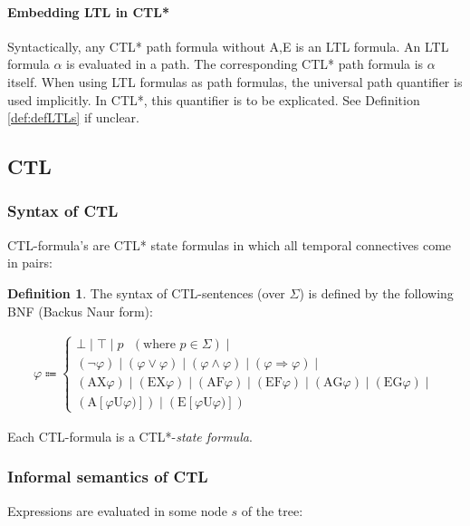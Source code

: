 \documentclass[10pt,a4paper]{article}
\theoremstyle{definition}
\newtheorem{definition}{Definition}[section]
\begin{document}
\paragraph{Embedding LTL in CTL*}

Syntactically, any CTL* path formula without A,E is an LTL formula. An LTL formula $\alpha$ is evaluated in a path. The corresponding CTL* path formula is $\alpha$ itself. When using LTL formulas as path formulas, the universal path quantifier is used implicitly. In CTL*, this quantifier is to be explicated. See Definition \ref{def:defLTLs} if unclear.

\subsection{CTL}

\subsubsection{Syntax of CTL}

CTL-formula’s are CTL* state formulas in which all temporal connectives come in pairs:

\begin{definition}
The syntax of CTL-sentences (over $\Sigma$) is defined by the following BNF (Backus Naur form):

\begin{gather*}
\varphi \Coloneqq
\begin{cases}
	\bot \mid \top \mid p \text{ } (\text{where } p \in \Sigma) \mid \\
	(\lnot \varphi) \mid (\varphi \lor \varphi) \mid (\varphi \land \varphi) \mid (\varphi \Rightarrow \varphi) \mid \\
	(\text{AX}\varphi) \mid (\text{EX}\varphi) \mid (\text{AF}\varphi) \mid (\text{EF}\varphi) \mid (\text{AG}\varphi) \mid (\text{EG}\varphi) \mid \\
	 (\text{A}[\varphi \text{U} \varphi)]) \mid (\text{E}[\varphi \text{U} \varphi)])
\end{cases}
\end{gather*}
\end{definition}

Each CTL-formula is a CTL*-\textit{state formula}.

\subsubsection{Informal semantics of CTL} Expressions are evaluated in some node $s$ of the tree:
\end{document}
